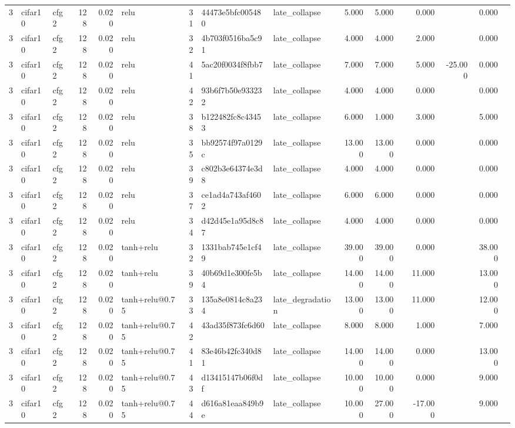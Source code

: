 \begin{table}[htbp]
{\begin{tabular}{@{}rllrrlrllrrrrrrr@{}}
3 & cifar10 & cfg2 & 128 & 0.020 & relu & 31 & 44473e5bfc005480 & late\_collapse & 5.000 & 5.000 &  & 0.000 &  & 0.000 &  \\
3 & cifar10 & cfg2 & 128 & 0.020 & relu & 32 & 4b703f0516ba5c91 & late\_collapse & 4.000 & 4.000 &  & 2.000 &  & 0.000 &  \\
3 & cifar10 & cfg2 & 128 & 0.020 & relu & 41 & 5ac20f0034f8fbb7 & late\_collapse & 7.000 & 7.000 &  & 5.000 & -25.000 & 0.000 &  \\
3 & cifar10 & cfg2 & 128 & 0.020 & relu & 42 & 93b6f7b50e933232 & late\_collapse & 4.000 & 4.000 &  & 0.000 &  & 0.000 &  \\
3 & cifar10 & cfg2 & 128 & 0.020 & relu & 38 & b122482fc8c43453 & late\_collapse & 6.000 & 1.000 &  & 3.000 &  & 5.000 &  \\
3 & cifar10 & cfg2 & 128 & 0.020 & relu & 35 & bb92574f97a0129c & late\_collapse & 13.000 & 13.000 &  & 0.000 &  & 0.000 &  \\
3 & cifar10 & cfg2 & 128 & 0.020 & relu & 39 & c802b3e64374e3d8 & late\_collapse & 4.000 & 4.000 &  & 0.000 &  & 0.000 &  \\
3 & cifar10 & cfg2 & 128 & 0.020 & relu & 37 & ce1ad4a743af4602 & late\_collapse & 6.000 & 6.000 &  & 0.000 &  & 0.000 &  \\
3 & cifar10 & cfg2 & 128 & 0.020 & relu & 34 & d42d45e1a95d8c87 & late\_collapse & 4.000 & 4.000 &  & 0.000 &  & 0.000 &  \\
3 & cifar10 & cfg2 & 128 & 0.020 & tanh+relu & 32 & 1331bab745e1cf49 & late\_collapse & 39.000 & 39.000 &  & 0.000 &  & 38.000 &  \\
3 & cifar10 & cfg2 & 128 & 0.020 & tanh+relu & 39 & 40b69d1e300fe5b4 & late\_collapse & 14.000 & 14.000 &  & 11.000 &  & 13.000 &  \\
3 & cifar10 & cfg2 & 128 & 0.020 & tanh+relu@0.75 & 33 & 135a8e0814c8a234 & late\_degradation & 13.000 & 13.000 &  & 11.000 &  & 12.000 &  \\
3 & cifar10 & cfg2 & 128 & 0.020 & tanh+relu@0.75 & 42 & 43ad35f873fc6d60 & late\_collapse & 8.000 & 8.000 &  & 1.000 &  & 7.000 &  \\
3 & cifar10 & cfg2 & 128 & 0.020 & tanh+relu@0.75 & 41 & 83e46b42fc340d81 & late\_collapse & 14.000 & 14.000 &  & 0.000 &  & 13.000 &  \\
3 & cifar10 & cfg2 & 128 & 0.020 & tanh+relu@0.75 & 43 & d13415147b06f0df & late\_collapse & 10.000 & 10.000 &  & 0.000 &  & 9.000 &  \\
3 & cifar10 & cfg2 & 128 & 0.020 & tanh+relu@0.75 & 44 & d616a81eaa849b9e & late\_collapse & 10.000 & 27.000 &  & -17.000 &  & 9.000 &  \\

\end{tabular}}
\end{table}

